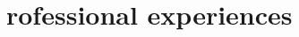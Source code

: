 \documentclass[11pt, a4paper]{article} %
\newcommand*\fanMobile{{\FA\symbol{"F10B}}}
\begin{document}







\section*{rofessional experiences \hrulefill}
\end{document}
